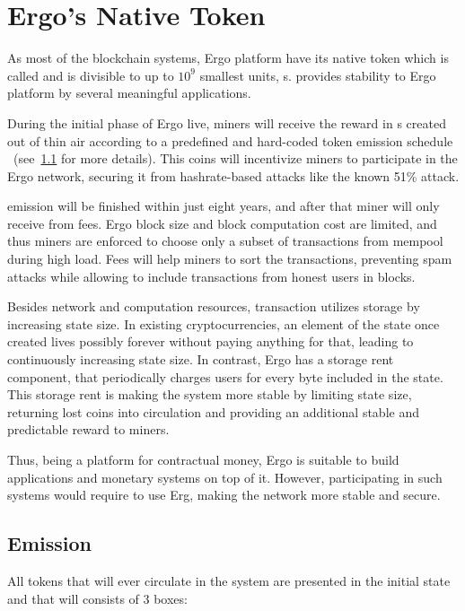 \section{Ergo's Native Token}
\label{sec:currency}

As most of the blockchain systems, Ergo platform have its native token which is
called \Erg{} and is divisible to up to $10^9$ smallest units, \nanoErg{}s.
\Erg{} provides stability to Ergo platform by several meaningful applications.

During the initial phase of Ergo live, miners will receive the reward in \Erg{}s created
out of thin air according to a predefined and hard-coded token emission schedule
~(see~\ref{sec:emission} for more details).
This coins will incentivize miners to participate in the Ergo network, securing it from hashrate-based attacks
like the known 51\% attack.

\Erg{} emission will be finished within just eight years, and after that miner will only receive \Erg{} from
fees.
Ergo block size and block computation cost are limited, and thus miners are enforced to
choose only a subset of transactions from mempool during high load.
Fees will help miners to sort the transactions, preventing spam attacks while allowing
to include transactions from honest users in blocks.

Besides network and computation resources, transaction utilizes storage by increasing state size.
In existing cryptocurrencies, an element of the state once created lives possibly forever without
paying anything for that, leading to continuously increasing state size.
In contrast, Ergo has a storage rent component, that periodically charges users for every byte
included in the state.
This storage rent is making the system more stable by limiting state size, returning lost coins into
circulation and providing an additional stable and predictable reward to miners.

Thus, being a platform for contractual money, Ergo is suitable to build applications and monetary systems
on top of it.
However, participating in such systems would require to use Erg, making the network more stable and secure.

\subsection{Emission}
\label{sec:emission}


All \Erg{} tokens that will ever circulate in the system are presented in the initial state and
that will consists of 3 boxes:

